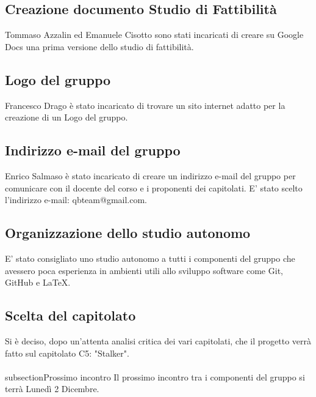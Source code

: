 \subsection{Creazione documento Studio di Fattibilità}
Tommaso Azzalin ed Emanuele Cisotto sono stati incaricati di creare su Google Docs una prima versione dello studio di fattibilità.\\

\subsection{Logo del gruppo}
Francesco Drago è stato incaricato di trovare un sito internet adatto per la creazione di un Logo del gruppo.\\

\subsection{Indirizzo e-mail del gruppo}
Enrico Salmaso è stato incaricato di creare un indirizzo e-mail del gruppo per comunicare con il docente del corso e i proponenti dei capitolati.
E' stato scelto l'indirizzo e-mail: qbteam@gmail.com.\\

\subsection{Organizzazione dello studio autonomo}
E' stato consigliato uno studio autonomo a tutti i componenti del gruppo che avessero poca esperienza in ambienti utili allo sviluppo software come Git, GitHub e LaTeX.\\

\subsection{Scelta del capitolato}
Si è deciso, dopo un'attenta analisi critica dei vari capitolati, che il progetto verrà fatto sul capitolato C5: "Stalker".\\

\\subsection{Prossimo incontro}
Il prossimo incontro tra i componenti del gruppo si terrà Lunedì 2 Dicembre.\\
\clearpage